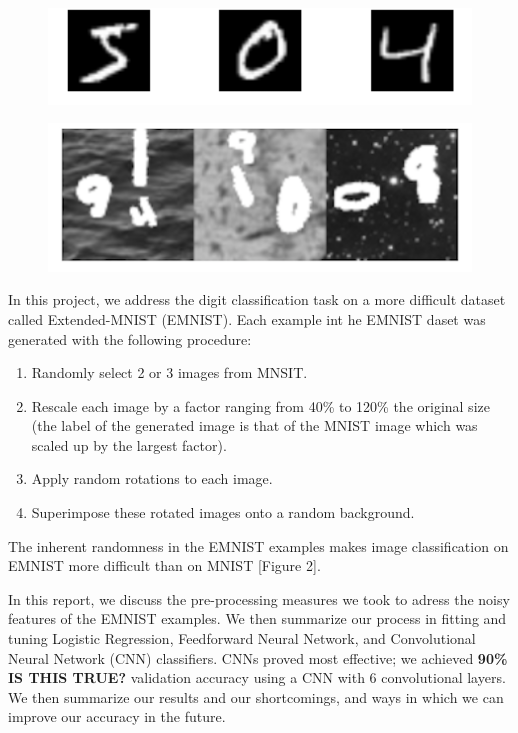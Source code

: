 \documentclass[letterpaper, 10 pt, conference]{ieeeconf}  %
\begin{document}
\begin{figure}[ht]
\centering
\begin{minipage}{.5\textwidth}
  \centering
  \includegraphics[width=1\linewidth]{mnist_sample}
  \label{fig:test1}
\end{minipage}%
\begin{minipage}{.5\textwidth}
  \centering
  \includegraphics[width=1\linewidth]{emnist_sample}
  \label{fig:test2}
\end{minipage}
\end{figure}

In this project, we address the digit classification task on a more difficult dataset called Extended-MNIST (EMNIST). Each example int he EMNIST daset was generated with the following procedure:
\begin{enumerate}
\item Randomly select 2 or 3 images from MNSIT.
\item Rescale each image by a factor ranging from 40\% to 120\% the original size (the label of the generated image is that of the MNIST image which was scaled up by the largest factor).
\item Apply random rotations to each image. 
\item Superimpose these rotated images onto a random background.
\end{enumerate}

The inherent randomness in the EMNIST examples makes image classification on EMNIST more difficult than on MNIST [Figure 2]. 

In this report, we discuss the pre-processing measures we took to adress the noisy features of the EMNIST examples. We then summarize our process in fitting and tuning Logistic Regression, Feedforward Neural Network, and Convolutional Neural Network (CNN) classifiers. CNNs proved most effective; we achieved \textbf{90\% IS THIS TRUE?} validation accuracy using a CNN with 6 convolutional layers. We then summarize our results and our shortcomings, and ways in which we can improve our accuracy in the future. 
\end{document}
